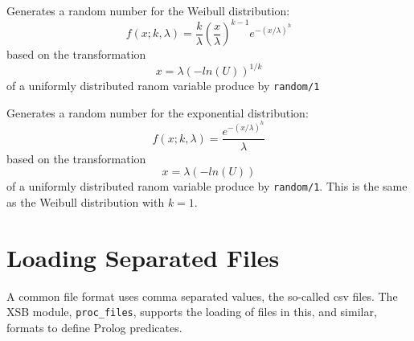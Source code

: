\begin{description}
 
%
Generates a random number for the Weibull distribution:
\[
  f(x;k,\lambda) = \frac{k}{\lambda}(\frac{x}{\lambda})^{k-1}e^{-(x/\lambda)^h}
\]
based on the transformation
\[
  x = \lambda(-ln(U))^{1/k}
\]
of a uniformly distributed ranom variable produce by {\tt random/1}

 
%
Generates a random number for the exponential distribution:
\[
  f(x;k,\lambda) = \frac{e^{-(x/\lambda)^h}}{\lambda}
\]
based on the transformation
\[
  x = \lambda(-ln(U))
\]
of a uniformly distributed ranom variable produce by {\tt random/1}.
This is the same as the Weibull distribution with $k = 1$.

\end{description}

\section{Loading Separated Files}

A common file format uses comma separated values, the so-called csv
files.  The XSB module, {\tt proc\_files}, supports the loading of
files in this, and similar, formats to define Prolog predicates.

